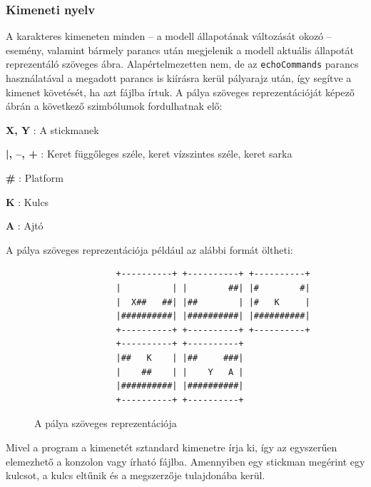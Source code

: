 	    \subsubsection{Kimeneti nyelv}	
	    A karakteres kimeneten minden -- a modell állapotának változását okozó -- esemény, valamint bármely parancs után megjelenik a modell aktuális állapotát reprezentáló szöveges ábra. Alapértelmezetten nem, de az \texttt{echoCommands} parancs használatával a megadott parancs is kiírásra kerül pályarajz után, így segítve a kimenet követését, ha azt fájlba írtuk. A pálya szöveges reprezentációját képező ábrán a következő szimbólumok fordulhatnak elő:
	    
	    \begin{description}
	        \newcommand{\frameitem}[1]{\item{\textbf{#1}} }
	        \frameitem{X, Y}: A stickmanek
	        \frameitem{|, --, +}: Keret függőleges széle, keret vízszintes széle, keret sarka
	        \frameitem{\#}: Platform
	        \frameitem{K}: Kulcs
	        \frameitem{A}: Ajtó
        \end{description}

        A pálya szöveges reprezentációja például az alábbi formát öltheti:
        
		\begin{figure}[hb]
		  \begin{center}
		\begin{verbatim}
                +----------+ +----------+ +----------+
                |          | |        ##| |#        #|
                |  X##   ##| |##        | |#   K     |
                |##########| |##########| |##########|
                +----------+ +----------+ +----------+
                +----------+ +----------+
                |##   K    | |##     ###|
                |    ##    | |    Y   A |
                |##########| |##########|
                +----------+ +----------+
		\end{verbatim}
		  \caption{A pálya szöveges reprezentációja}
		  \end{center}
		\end{figure}        
        
        Mivel a program a kimenetét sztandard kimenetre írja ki, így az egyszerűen elemezhető a konzolon vagy írható fájlba. Amennyiben egy stickman megérint egy kulcsot, a kulcs eltűnik és a megszerzője tulajdonába kerül.
	
